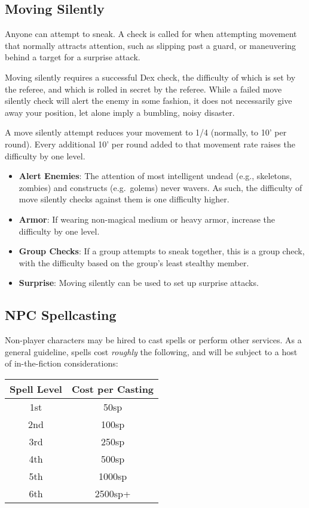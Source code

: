 \documentclass{article}
\begin{document}
\begin{multicols}{2}
\subsection{Moving Silently}\label{moving-silently}

Anyone can attempt to sneak. A check is called for when attempting
movement that normally attracts attention, such as slipping past a
guard, or maneuvering behind a target for a surprise attack.

Moving silently requires a successful Dex check, the difficulty of which
is set by the referee, and which is rolled in secret by the referee.
While a failed move silently check will alert the enemy in some fashion,
it does not necessarily give away your position, let alone imply a
bumbling, noisy disaster.

A move silently attempt reduces your movement to 1/4 (normally, to 10'
per round). Every additional 10' per round added to that movement rate
raises the difficulty by one level.

\begin{itemize}
\tightlist
\item
  \textbf{Alert Enemies}: The attention of most intelligent undead
  (e.g., skeletons, zombies) and constructs (e.g.~golems) never wavers.
  As such, the difficulty of move silently checks against them is one
  difficulty higher.
\item
  \textbf{Armor}: If wearing non-magical medium or heavy armor, increase
  the difficulty by one level.
\item
  \textbf{Group Checks}: If a group attempts to sneak together, this is
  a group check, with the difficulty based on the group's least stealthy
  member.
\item
  \textbf{Surprise}: Moving silently can be used to set up surprise
  attacks.
\end{itemize}

\subsection{NPC Spellcasting}\label{npc-spellcasting}

Non-player characters may be hired to cast spells or perform other
services. As a general guideline, spells cost \emph{roughly} the
following, and will be subject to a host of in-the-fiction
considerations:

\begin{longtable}[]{@{}cc@{}}
\toprule\noalign{}
Spell Level & Cost per Casting \\
\midrule\noalign{}
\endhead
\bottomrule\noalign{}
\endlastfoot
1st & 50sp \\
2nd & 100sp \\
3rd & 250sp \\
4th & 500sp \\
5th & 1000sp \\
6th & 2500sp+ \\
\end{longtable}


\end{multicols}
\end{document}
